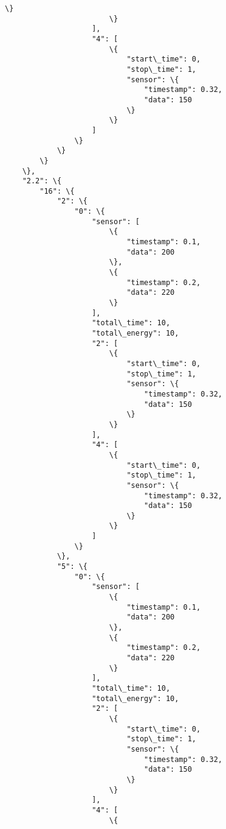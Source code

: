 \documentclass[11pt]{article}
\begin{document}
\begin{Verbatim}[commandchars=\\\{\}]
                            \}
                        \}
                    ],
                    "4": [
                        \{
                            "start\_time": 0,
                            "stop\_time": 1,
                            "sensor": \{
                                "timestamp": 0.32,
                                "data": 150
                            \}
                        \}
                    ]
                \}
            \}
        \}
    \},
    "2.2": \{
        "16": \{
            "2": \{
                "0": \{
                    "sensor": [
                        \{
                            "timestamp": 0.1,
                            "data": 200
                        \},
                        \{
                            "timestamp": 0.2,
                            "data": 220
                        \}
                    ],
                    "total\_time": 10,
                    "total\_energy": 10,
                    "2": [
                        \{
                            "start\_time": 0,
                            "stop\_time": 1,
                            "sensor": \{
                                "timestamp": 0.32,
                                "data": 150
                            \}
                        \}
                    ],
                    "4": [
                        \{
                            "start\_time": 0,
                            "stop\_time": 1,
                            "sensor": \{
                                "timestamp": 0.32,
                                "data": 150
                            \}
                        \}
                    ]
                \}
            \},
            "5": \{
                "0": \{
                    "sensor": [
                        \{
                            "timestamp": 0.1,
                            "data": 200
                        \},
                        \{
                            "timestamp": 0.2,
                            "data": 220
                        \}
                    ],
                    "total\_time": 10,
                    "total\_energy": 10,
                    "2": [
                        \{
                            "start\_time": 0,
                            "stop\_time": 1,
                            "sensor": \{
                                "timestamp": 0.32,
                                "data": 150
                            \}
                        \}
                    ],
                    "4": [
                        \{

\end{Verbatim}
\end{document}
